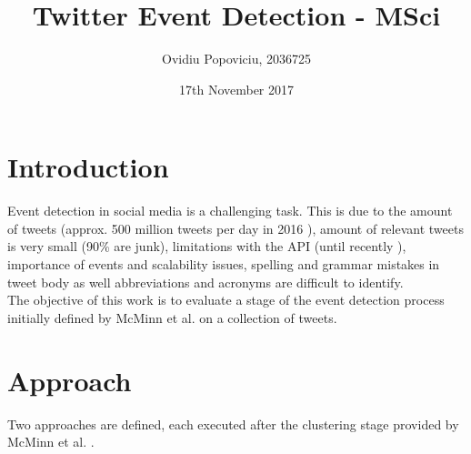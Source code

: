\documentclass[a4paper,portrait,12pt]{article}
\begin{document}
\setlength{\oddsidemargin}{0.9847in-1in}
\setlength{\textwidth}{\paperwidth - 0.9847in-0.9847in}

\author{Ovidiu Popoviciu, 2036725}
\date{17th November 2017}
\title{Twitter Event Detection - MSci}
\maketitle

\section{Introduction}

Event detection in social media is a challenging task.
This is due to the amount of tweets (approx. 500 million tweets per day in 2016 \cite{tweetStats}), amount of relevant tweets is very small (90\% are junk), limitations with the API (until recently \cite{twitterPremium}), importance of events and scalability issues, spelling and grammar mistakes in tweet body as well abbreviations and acronyms are difficult to identify.\\
The objective of this work is to evaluate a stage of the event detection process initially defined by McMinn et al. \cite{McMinn2013} \cite{McMinn2015} on a collection of tweets.

\section{Approach}
\cite{McMinn2013} \cite{McMinn2015}

Two approaches are defined, each executed after the clustering stage provided by McMinn et al. \cite{McMinn2013}.
\end{document}
